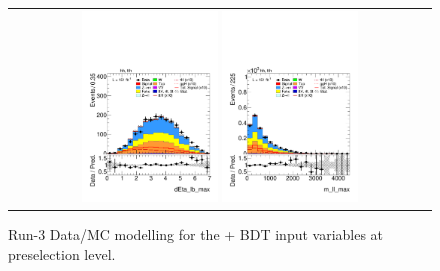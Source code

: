 \begin{figure}[htbp]
\begin{tabular}{@{}c c c@{}}
    \\[4pt]
    \multicolumn{3}{c}{%
      \includegraphics[width=0.33\textwidth]{images/plots_modelling_run2_run3_variables/run_3_tth/plot_dEta_lb_max_hh_tth_22_23_24.pdf}%
      \hspace{1.5pt}%
      \includegraphics[width=0.33\textwidth]{images/plots_modelling_run2_run3_variables/run_3_tth/plot_m_ll_max_hh_tth_22_23_24.pdf}%
    }\\
  \end{tabular}

  \caption{Run-3 Data/MC modelling for the \thqb + \ttH BDT input variables at preselection level.}
  \label{tth_vars_modelling_run3_3}
\end{figure}




